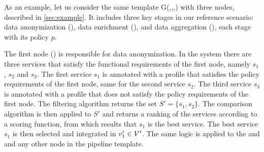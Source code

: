 \begin{example}\label{ex:instance}

  As an example, let us consider the same template G(\V,\E,\myLambda,\myGamma) with three nodes, described in \cref{sec:example}.
  It includes three key stages in our reference scenario: data anonymization (), data enrichment (), and data aggregation (), each stage with its policy $p$.

  The first node () is responsible for data anonymization.
  In the system there are three services that satisfy the functional requirements of the first node, namely $s_1$, $s_2$ and $s_3$.
  The first service $s_1$ is annotated with a profile that satisfies the policy requirements of the first node, same for the second service $s_2$.
  The third service $s_3$ is annotated with a profile that does not satisfy the policy requirements of the first node.
  The filtering algorithm returns the set $S'=\{s_1,s_2\}$.
  The comparison algorithm is then applied to $S'$ and returns a ranking of the services according to a scoring function, from which results that $s_1$ is the best service.
  The best service $s_1$ is then selected and integrated in $v'_{1}\in V'$.
  The same logic is applied to the  and  and any other node in the pipeline template.

\end{example}







